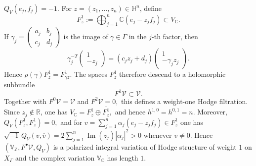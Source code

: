 \documentclass[12 pt]{amsart}
\theoremstyle{definition}
\begin{document}
\(
Q_V(e_j,f_j)=-1.
\)
For $z=(z_1,\ldots,z_n)\in\mathbb H^n$, define
\[
F_z^1:=\bigoplus_{j=1}^n\mathbb C(e_j-z_jf_j)\subset V_{\mathbb C}.
\]
If
\(
\gamma_j=\begin{pmatrix}a_j&b_j\\c_j&d_j\end{pmatrix}
\)
is the image of $\gamma\in\Gamma$ in the $j$-th factor, then
\begin{equation}\label{Automporphic}
\gamma_j^{-T}\begin{pmatrix}1\\-z_j\end{pmatrix}
=(c_jz_j+d_j)\begin{pmatrix}1\\-\gamma_jz_j\end{pmatrix}.
\end{equation}
Hence
\(
\rho(\gamma)F_z^1=F_{\gamma z}^1.
\)
The spaces $F_z^1$ therefore descend to a holomorphic subbundle
\[
F^1\mathcal V\subset\mathcal V.
\]
Together with
\(
F^0\mathcal V=\mathcal V
\)
and
\(
F^2\mathcal V=0,
\)
this defines a weight-one Hodge filtration. Since $z_j\notin\mathbb R$, one has
\(
V_{\mathbb C}=F_z^1\oplus\overline{F_z^1},
\)
and hence
\(
h^{1,0}=h^{0,1}=n.
\)
Moreover,
\(
Q_V(F_z^1,F_z^1)=0,
\)
and for
\(
v=\sum_{j=1}^n\alpha_j(e_j-z_jf_j)\in F_z^1
\)
one has
\(
\sqrt{-1}\,Q_V(v,\overline v)
=2\sum_{j=1}^n\operatorname{Im}(z_j)|\alpha_j|^2>0
\)
whenever $v\neq0$. Hence
\(
(\mathbb V_{\mathbb Z},F^\bullet\mathcal V,Q_V)
\)
is a polarized integral variation of Hodge structure of weight $1$ on $X_\Gamma$ and the complex variation $\mathbb V_{\mathbb C}$ has length $1.$
\end{document}
